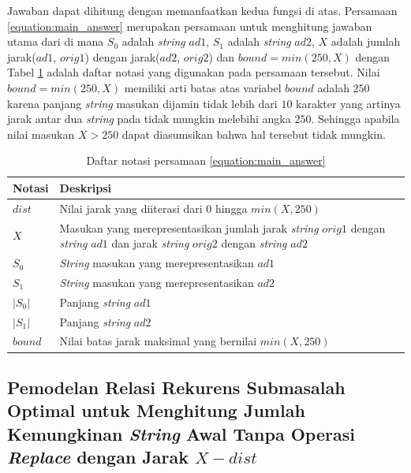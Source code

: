 Jawaban \problem{} dapat dihitung dengan memanfaatkan kedua fungsi di atas. Persamaan \ref{equation:main_answer} merupakan persamaan untuk menghitung jawaban utama dari \problem{} di mana $S_{0}$ adalah \textit{string} $ad1$, $S_{1}$ adalah \textit{string} $ad2$, $X$ adalah jumlah jarak($ad1$, $orig1$) dengan jarak($ad2$, $orig2$) dan $bound=min(250, X)$ dengan Tabel \ref{tab:daftar_notasi_main_answer} adalah daftar notasi yang digunakan pada persamaan tersebut. Nilai $ bound = min(250, X) $ memiliki arti batas atas variabel $ bound $ adalah $ 250 $ karena panjang \textit{string} masukan dijamin tidak lebih dari $ 10 $ karakter yang artinya jarak antar dua \textit{string} pada \problem{} tidak mungkin melebihi angka $ 250 $. Sehingga apabila nilai masukan $ X>250 $ dapat diasumsikan bahwa hal tersebut tidak mungkin. 

\begin{table}[H]
	\centering
	\begin{tabular} {|p{3cm}|p{5cm}|} \hline
		Notasi & Deskripsi\\ \hline
		$ dist $ & Nilai jarak yang diiterasi dari 0 hingga $ min(X, 250) $\\ \hline
		$ X $ & Masukan yang merepresentasikan jumlah jarak \textit{string} $ orig1 $ dengan \textit{string} $ ad1 $ dan jarak \textit{string} $ orig2 $ dengan \textit{string} $ ad2 $ \\ \hline
		$ S_{0} $ & \textit{String} masukan yang merepresentasikan $ ad1 $\\ \hline
		$ S_{1} $ & \textit{String} masukan yang merepresentasikan $ ad2 $\\ \hline
		$ |S_{0}| $ & Panjang \textit{string} $ ad1 $\\ \hline
		$ |S_{1}| $ & Panjang \textit{string} $ ad2 $\\ \hline
		$ bound $ & Nilai batas jarak maksimal yang bernilai $ min(X, 250) $\\ \hline
	\end{tabular}\caption{Daftar notasi persamaan \ref{equation:main_answer}}
	\label{tab:daftar_notasi_main_answer}
\end{table}

\subsection{Pemodelan Relasi Rekurens Submasalah Optimal untuk Menghitung Jumlah Kemungkinan \textit{String} Awal Tanpa Operasi \textit{Replace} dengan Jarak $X-dist$}
\label{subsec:pemodelan_relasi_rekurens_submasalah_optimal_untuk_menghitung_jumlah_kemungkinan_string_awal_tanpa_operasi_replace}

